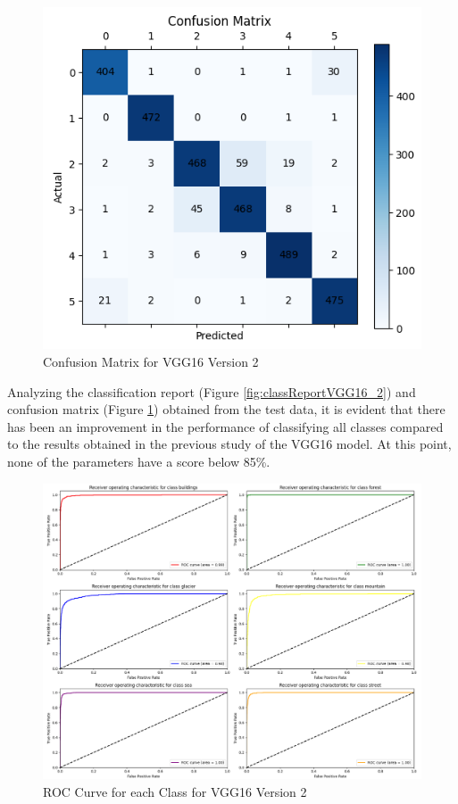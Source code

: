 \documentclass[conference]{IEEEtran}
\begin{document}
\begin{figure}[H]
    \centering
    \includegraphics[width=0.7\linewidth]{images/confMatrixVGG16_2.png}
    \caption{Confusion Matrix for VGG16 Version 2}
    \label{fig:confMatrixVGG16_2}
\end{figure}

Analyzing the classification report (Figure \ref{fig:classReportVGG16_2}) and confusion matrix (Figure \ref{fig:confMatrixVGG16_2}) obtained from the test data, it is evident that there has been an improvement in the performance of classifying all classes compared to the results obtained in the previous study of the VGG16 model. At this point, none of the parameters have a score below 85\%.

\begin{figure}[H]
    \centering
    \includegraphics[width=0.9\linewidth]{images/rocCurvesVGG16_2.png}
    \caption{ROC Curve for each Class for VGG16 Version 2}
    \label{fig:rocCurvesVGG16_2}
\end{figure}
\end{document}
